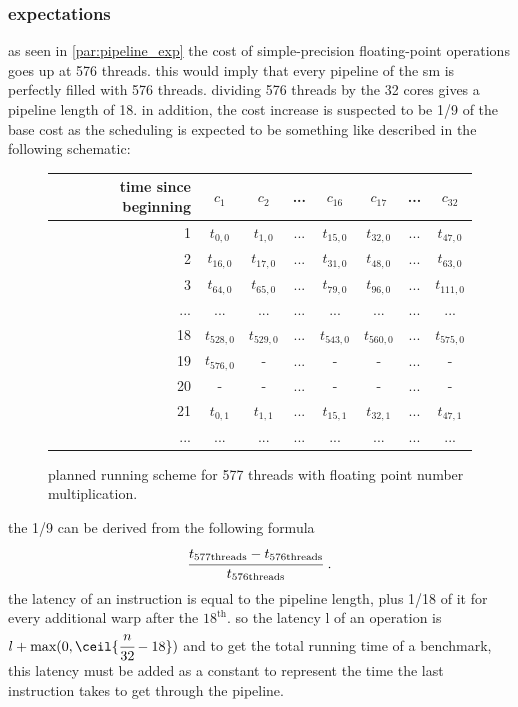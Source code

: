 \documentclass{report}
\begin{document}
	\subsubsection{expectations}
	as seen in \ref{par:pipeline_exp} the cost of simple-precision floating-point
    operations goes up at 576 threads. this would imply that every pipeline of
    the sm is perfectly filled with 576 threads. dividing 576 threads by
    the 32 cores gives a pipeline length of 18. in addition, the cost increase
    is suspected to be 1/9 of the base cost as the scheduling is expected to be
    something like described in the following schematic:
    
    \begin{figure}[h]
      \centering
       \begin{tabular}{ | r || c | c | c | c || c | c | c | }
    	    \hline
    	    time since beginning & $c_1$ & $c_2$ & ... & $c_{16}$ & $c_{17}$ & ... & $c_{32}$ \\ \hline  \hline
    	   1 & $t_{0,0}$ & $t_{1,0}$ & ... & $t_{15,0}$ & $t_{32, 0}$ & ... & $t_{47, 0}$ \\ \hline 
    	   2 & $t_{16,0}$ & $t_{17,0}$ & ... & $t_{31,0}$ & $t_{48, 0}$ & ... & $t_{63, 0}$ \\ \hline
    	   3 & $t_{64,0}$ & $t_{65,0}$ & ... & $t_{79,0}$ & $t_{96, 0}$ & ... & $t_{111, 0}$ \\ \hline
    	   ... & ... & ... & ... & ... & ... & ... & ... \\ \hline
    	   18 & $t_{528,0}$ & $t_{529,0}$ & ... & $t_{543,0}$ & $t_{560,0}$ & ... & $t_{575, 0}$ \\ \hline
    	   19 & $t_{576,0}$ & - & ... & - & - & ... & - \\ \hline
    	   20 & - & - & ... & - & - & ... & - \\ \hline
    	   21 & $t_{0,1}$ & $t_{1,1}$ & ... & $t_{15,1}$ & $t_{32,1}$ & ... & $t_{47,1}$ \\ \hline
    	   ... & ... & ... & ... & ... & ... & ... & ... \\ \hline
  	\end{tabular}
  	\captionsetup{justification=centering}
  	\caption{planned running scheme for 577 threads with floating point number multiplication.}
  	\label{fig:fp_prediction_513}
   \end{figure}

    the 1/9 can be derived from the following formula
    \[ \cfrac{t_{\text{577threads}} - t_{\text{576threads}}}{t_{\text{576threads}}} \text{  .}\]
    the latency of an instruction is equal to the pipeline length, plus 1/18 of
    it for every additional warp after the $18^{\text{th}}$. so the latency l of an 
    operation is $l + \text{max}(0, \ceil{\cfrac{n}{32} -18})$ and to get the total
    running time of a benchmark, this latency must be added as a constant to
    represent the time the last instruction takes to get through the pipeline.
\end{document}
